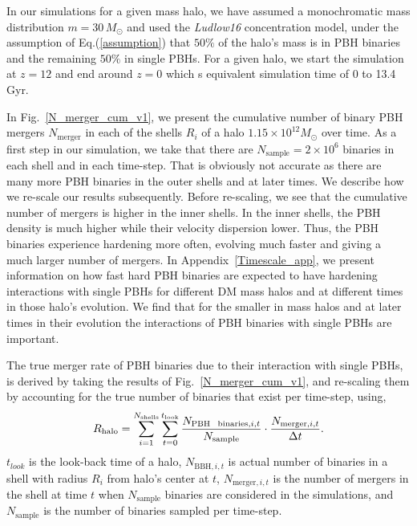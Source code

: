 \documentclass[aps, prd, reprint, nofootinbib]{revtex4-2}
\begin{document}
In our simulations for a given mass halo, we have assumed a monochromatic mass distribution $m=30 \, M_{\odot}$ and used the \textit{Ludlow16} concentration model, under the assumption of Eq.(\ref{assumption}) that $50\%$ of the halo's mass is in PBH binaries and the remaining $50\%$ in single PBHs. For a given halo, we start the simulation at $z=12$ and end around $z=0$ which s equivalent simulation time of 0 to 13.4 Gyr.

In Fig.~\ref{N_merger_cum_v1}, we present the cumulative number of binary PBH mergers $N_{\textrm{merger}}$ in each of the shells $R_{i}$ of a halo $1.15 \times 10^{12} M_\odot$ over time. 
As a first step in our simulation, we take that there are 
$N_{\textrm{sample}}=2\times 10^{6}$  binaries in each shell and in each time-step. That is obviously not accurate as there are many more PBH binaries in the outer shells and at later times. We describe how we re-scale our results subsequently.  
Before re-scaling, we see that the cumulative number of mergers is higher in the inner shells. In the inner shells, the PBH density is much higher while their velocity dispersion lower. Thus, the PBH binaries experience hardening more often, evolving much faster and giving a much larger number of mergers. In Appendix~\ref{Timescale_app}, we present information on how fast hard PBH binaries are expected to have hardening interactions with single PBHs for different DM mass halos and at different times in those halo's evolution. We find that for the smaller in mass halos and at later times in their evolution the interactions of PBH binaries with single PBHs are important.  

The true merger rate of PBH binaries due to their interaction with single PBHs, is derived by taking the results of Fig.~\ref{N_merger_cum_v1}, and re-scaling them by accounting for the true number of binaries that exist per time-step, using,
\begin{equation}
R_{\textrm{halo}} = \sum_{i=1}^{N_{\textrm{shells}}} \sum_{t=0}^{t_{\textrm{look}}} \frac{N_{\textrm{PBH  \, binaries}, i, t}}{N_{\textrm{sample}}} \cdot 
\frac{N_{\text{merger}, i, t}}{\Delta t}
.
\end{equation}
$t_{look}$ is the look-back time of a halo, $N_{\textrm{BBH}, i, t}$ is actual number of binaries in a shell with radius $R_{i}$ from halo's center at $t$, $N_{\textrm{merger},i,t}$ is the number of mergers in the shell at time $t$ when $N_{\textrm{sample}}$ binaries are considered in the simulations, and $N_{\textrm{sample}}$ is the number of binaries sampled per time-step. 
\end{document}
